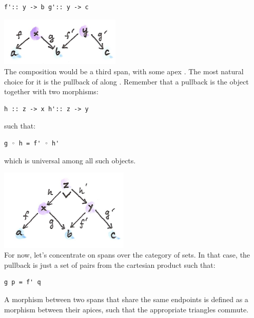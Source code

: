 \begin{Verbatim}[commandchars=\\\{\}]
f':: y -> b g':: y -> c
\end{Verbatim}

\includegraphics[width=2.26042in]{images/compspan.png}\\
The composition would be a third span, with some apex . The
most natural choice for it is the pullback of  along
. Remember that a pullback is the object 
together with two morphisms:

\begin{Verbatim}[commandchars=\\\{\}]
h :: z -> x h':: z -> y
\end{Verbatim}

such that:

\begin{Verbatim}[commandchars=\\\{\}]
g ◦ h = f' ◦ h'
\end{Verbatim}

which is universal among all such objects.

\includegraphics[width=2.42708in]{images/pullspan.png}\\
For now, let's concentrate on spans over the category of sets. In that
case, the pullback is just a set of pairs  from the
cartesian product  such that:

\begin{Verbatim}[commandchars=\\\{\}]
g p = f' q
\end{Verbatim}

A morphism between two spans that share the same endpoints is defined as
a morphism  between their apices, such that the appropriate
triangles commute.

